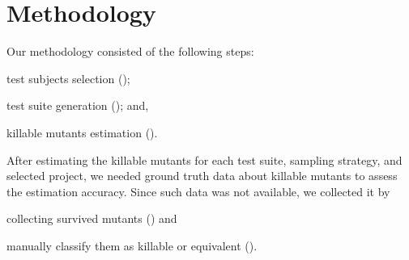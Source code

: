 \documentclass[sigconf,review,anonymous]{acmart}
\begin{document}

\section{Methodology}


Our methodology consisted of the following steps:
\begin{enumerate*}[label=(\arabic*)]
    \item test subjects selection ();
    \item test suite generation ();
    and, \item killable mutants estimation ().
\end{enumerate*}
%
After estimating the killable mutants for each test suite, sampling strategy, and selected project,
we needed ground truth data about killable mutants
to assess the estimation accuracy. %
Since such data was not available, %
we collected it by 
\begin{enumerate*}[label=(\arabic*),start=4]   
     \item collecting survived mutants () and
     \item manually classify them as killable or equivalent ().
\end{enumerate*}
\end{document}
